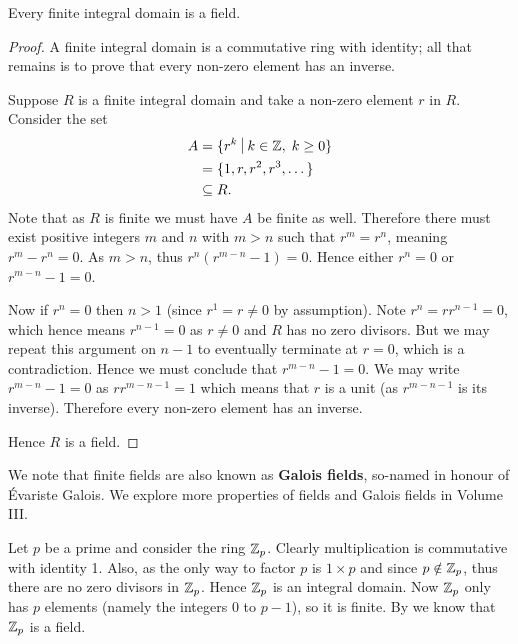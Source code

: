 \begin{theorem}\label{thrm-finite-integral-domain-is-field}
    Every finite integral domain is a field.
\end{theorem}
\begin{proof}
    A finite integral domain is a commutative ring with identity; all that remains is to prove that every non-zero element has an inverse.

    Suppose $R$ is a finite integral domain and take a non-zero element $r$ in $R$. Consider the set
    \begin{align*}
        A &= \{r^k \vert k \in \Z,\;k\geq 0\}\\
        &= \{1, r, r^2, r^3, \dots\}\\
        &\subseteq R.
    \end{align*}
    Note that as $R$ is finite we must have $A$ be finite as well. Therefore there must exist positive integers $m$ and $n$ with $m > n$ such that $r^m = r^n$, meaning $r^m - r^n = 0$. As $m > n$, thus $r^n\left(r^{m-n}-1\right) = 0$. Hence either $r^n = 0$ or $r^{m-n} - 1 = 0$.

    Now if $r^n = 0$ then $n > 1$ (since $r^1 = r \neq 0$ by assumption). Note $r^n = rr^{n-1} = 0$, which hence means $r^{n-1} = 0$ as $r \neq 0$ and $R$ has no zero divisors. But we may repeat this argument on $n - 1$ to eventually terminate at $r = 0$, which is a contradiction. Hence we must conclude that $r^{m-n} - 1 = 0$. We may write $r^{m-n}-1 = 0$ as $rr^{m-n-1} = 1$ which means that $r$ is a unit (as $r^{m-n-1}$ is its inverse). Therefore every non-zero element has an inverse.

    Hence $R$ is a field.
\end{proof}

\begin{remark}
    We note that finite fields are also known as \textbf{Galois fields}, so-named in honour of \'{E}variste Galois. We explore more properties of fields and Galois fields in Volume III.
\end{remark}

\begin{example}
    Let $p$ be a prime and consider the ring $\mathbb{Z}_p$. Clearly multiplication is commutative with identity 1. Also, as the only way to factor $p$ is $1 \times p$ and since $p \notin \mathbb{Z}_p$, thus there are no zero divisors in $\mathbb{Z}_p$. Hence $\mathbb{Z}_p$ is an integral domain. Now $\mathbb{Z}_p$ only has $p$ elements (namely the integers 0 to $p - 1$), so it is finite. By  we know that $\mathbb{Z}_p$ is a field.
\end{example}

